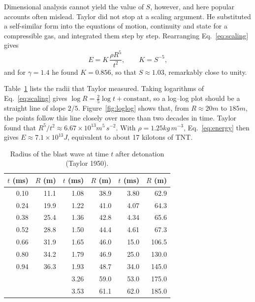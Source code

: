 \documentclass[11pt,a4paper]{article}
\begin{document}
\pn Dimensional analysis cannot yield the value of $S$, however, and here popular accounts often mislead. Taylor did not stop at a scaling argument. He substituted a self-similar form into the equations of motion, continuity and state for a compressible gas, and integrated them step by step. Rearranging Eq.~\eqref{eq:scaling} gives
\begin{equation}
  E = K\,\frac{\rho R^5}{t^2}, \qquad K = S^{-5},
  \label{eq:energy}
\end{equation}
and for $\gamma=1.4$ he found $K=0.856$, so that $S\approx1.03$, remarkably close to unity.


\pn Table~\ref{tab:data} lists the radii that Taylor measured. Taking logarithms of Eq.~\eqref{eq:scaling} gives $\log R = \tfrac25\log t + \text{constant}$, so a log--log plot should be a straight line of slope $2/5$. Figure~\ref{fig:loglog} shows that, from $R\approx20\unit{m}$ to $185\unit{m}$, the points follow this line closely over more than two decades in time. Taylor found that $R^5/t^2\approx6.67\times10^{13}\unit{m^5\,s^{-2}}$. With $\rho=1.25\unit{kg\,m^{-3}}$, Eq.~\eqref{eq:energy} then gives $E\approx7.1\times10^{13}\unit{J}$, equivalent to about 17 kilotons of TNT.

\begin{table}[t]
\centering\small
\caption{Radius of the blast wave at time $t$ after detonation (Taylor 1950).}
\label{tab:data}
\begin{tabular}{rrrrrr}
\toprule
\headrow $t$ (ms) & $R$ (m) & $t$ (ms) & $R$ (m) & $t$ (ms) & $R$ (m) \\
\midrule
0.10 & 11.1 & 1.08 & 38.9 & 3.80 & 62.9 \\
0.24 & 19.9 & 1.22 & 41.0 & 4.07 & 64.3 \\
0.38 & 25.4 & 1.36 & 42.8 & 4.34 & 65.6 \\
0.52 & 28.8 & 1.50 & 44.4 & 4.61 & 67.3 \\
0.66 & 31.9 & 1.65 & 46.0 & 15.0 & 106.5 \\
0.80 & 34.2 & 1.79 & 46.9 & 25.0 & 130.0 \\
0.94 & 36.3 & 1.93 & 48.7 & 34.0 & 145.0 \\
     &      & 3.26 & 59.0 & 53.0 & 175.0 \\
     &      & 3.53 & 61.1 & 62.0 & 185.0 \\
\bottomrule
\end{tabular}
\end{table}
\end{document}
